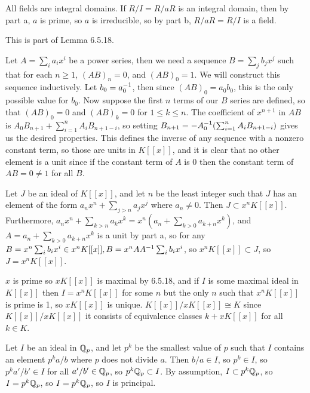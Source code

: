\documentclass[11pt, oneside]{article}   	%
\begin{document}
\item All fields are integral domains. If $R/I = R/aR$ is an integral domain, then by part a, $a$ is prime, so $a$ is irreducible, so by part b, $R/aR = R/I$ is a field.
\item This is part of Lemma 6.5.18.
\ee
\item \be
\item Let $A = \sum_ia_ix^i$ be a power series, then we need a sequence $B = \sum_jb_jx^j$ such that for each $n \ge 1$, $(AB)_n = 0$, and $(AB)_0 = 1$. We will construct this sequence inductively. Let $b_0 = a_0^{-1}$, then since $(AB)_0 = a_0b_0$, this is the only possible value for $b_0$. Now suppose the first $n$ terms of our $B$ series are defined, so that $(AB)_0 = 0$ and $(AB)_k = 0$ for $1 \le k \le n$. The coefficient of $x^{n+1}$ in $AB$ is $A_0B_{n+1} + \sum_{i=1}^n A_iB_{n+1-i}$, so setting $B_{n+1} = -A_0^{-1}(\sum_{i=1}^n A_iB_{n+1-i})$ gives us the desired properties. This defines the inverse of any sequence with a nonzero constant term, so those are units in $K[[x]]$, and it is clear that no other element is a unit since if the constant term of $A$ is 0 then the constant term of $AB = 0 \not=1$ for all $B$. 
\item Let $J$ be an ideal of $K[[x]]$, and let $n$ be the least integer such that $J$ has an element of the form $a_nx^n + \sum_{j>n} a_jx^j$ where $a_n \not = 0$. Then $J \subset x^nK[[x]]$. Furthermore, $a_nx^n + \sum_{k>n}a_kx^k = x^n(a_n + \sum_{k>0}a_{k+n}x^k)$, and $A = a_n + \sum_{k>0}a_{k+n}x^k$ is a unit by part a, so for any $B = x^n\sum_i b_i x^i \in x^nK[[x]], B = x^nAA^{-1} \sum_i b_ix^i$, so $x^nK[[x]] \subset J$, so $J = x^nK[[x]]$. 
\item $x$ is prime so $xK[[x]]$ is maximal by 6.5.18, and if $I$ is some maximal ideal in $K[[x]]$ then $I = x^nK[[x]]$ for some $n$ but the only $n$ such that $x^nK[[x]]$ is prime is 1, so $xK[[x]]$ is unique. $K[[x]] / xK[[x]] \cong K$ since $K[[x]] / xK[[x]]$ it consists of equivalence classes $k + xK[[x]]$ for all $k \in K$.
\ee
\item Let $I$ be an ideal in $\mathbb{Q}_p$, and let $p^k$ be the smallest value of $p$ such that $I$ contains an element $p^ka/b$ where $p$ does not divide $a$. Then $b/a \in I$, so $p^k \in I$, so $p^ka'/b' \in I$ for all $a'/b' \in \mathbb{Q}_p$, so $p^k\mathbb{Q}_p \subset I$. By assumption,  $I \subset p^k\mathbb{Q}_p$, so $I = p^k\mathbb{Q}_p$, so $I = p^k\mathbb{Q}_p$, so $I$ is principal.
\ee 
\end{document}
